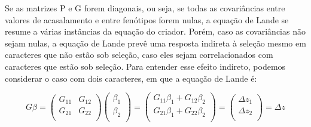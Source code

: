 \begin{refsection}
Se as matrizes P e G forem diagonais, ou seja, se todas as covariâncias entre
valores de acasalamento e entre fenótipos forem nulas, a equação de Lande se
resume a várias instâncias da equação do criador. Porém, caso as covariâncias
não sejam nulas, a equação de Lande prevê uma resposta indireta à seleção
mesmo em caracteres que não estão sob seleção, caso eles sejam
correlacionados com caracteres que estão sob seleção. Para entender esse
efeito indireto, podemos considerar o caso com dois caracteres, em que a
equação de Lande é:

\begin{equation}
G\beta  =
\left (
\begin{matrix}
G_{11} & G_{12} \\
G_{21} & G_{22} \\
\end{matrix}
\right )
\left (
\begin{matrix}
\beta_{1}  \\
\beta_{2}   \\
\end{matrix}
\right )
=
\left (
\begin{matrix}
G_{11}\beta_{1} +  G_{12}\beta_{2} \\
G_{21}\beta_{1} +  G_{22}\beta_{2} \\
\end{matrix}
\right )
=
\left (
\begin{matrix}
\Delta z_{1}  \\
\Delta z_{2}   \\
\end{matrix}
\right )
=
\Delta z
\end{equation}


\end{refsection}
